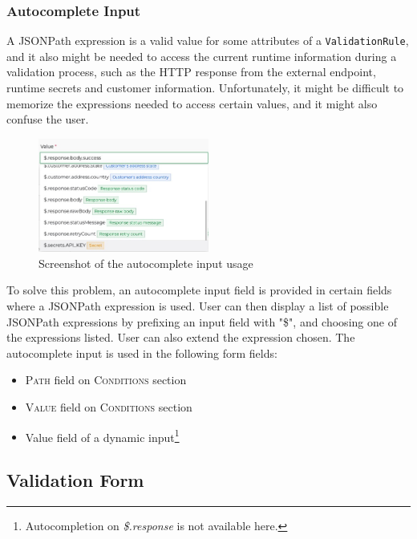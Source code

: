     \subsubsection{Autocomplete Input}

    A JSONPath expression is a valid value for some attributes of a \verb;ValidationRule;, and it also might be needed to access the current runtime information during a validation process, such as the HTTP response from the external endpoint, runtime secrets and customer information. Unfortunately, it might be difficult to memorize the expressions needed to access certain values, and it might also confuse the user. 

    \begin{figure}[!ht]
      \centering
      \includegraphics[width=0.5\textwidth]{images/ss_autocomplete.jpeg}
      \caption{Screenshot of the autocomplete input usage}
    \end{figure}

    To solve this problem, an autocomplete input field is provided in certain fields where a JSONPath expression is used. User can then display a list of possible JSONPath expressions by prefixing an input field with "\$", and choosing one of the expressions listed. User can also extend the expression chosen. The autocomplete input is used in the following form fields:

    \begin{itemize}
      \item \textsc{Path} field on \textsc{Conditions} section
      \item \textsc{Value} field on \textsc{Conditions} section
      \item Value field of a dynamic input\footnote{Autocompletion on \emph{\$.response} is not available here.}
    \end{itemize}

  \subsection{Validation Form}

